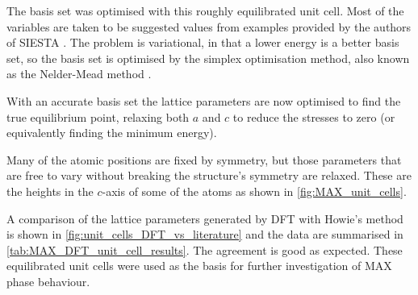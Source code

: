 The basis set was optimised with this roughly equilibrated unit cell. Most of the variables are taken to be suggested values  from examples provided by the authors of SIESTA \cite{SIESTA_manual}. The problem is variational, in that a lower energy is a better basis set, so the basis set is optimised by the simplex optimisation method, also known as the Nelder-Mead method \citep{Nelder1965}.

With an accurate basis set the lattice parameters are now optimised to find the true equilibrium point, relaxing both $a$ and $c$ to reduce the stresses to zero (or equivalently finding the minimum energy).


Many of the atomic positions are fixed by symmetry, but those parameters that are free to vary without breaking the structure's symmetry are relaxed. These are the heights in the $c$-axis of some of the atoms as shown in \autoref{fig:MAX_unit_cells}.


A comparison of the lattice parameters generated by DFT with Howie's method is shown in \autoref{fig:unit_cells_DFT_vs_literature} and the data are summarised in \autoref{tab:MAX_DFT_unit_cell_results}. The agreement is good as expected. These equilibrated unit cells were used as the basis for further investigation of MAX phase behaviour.

